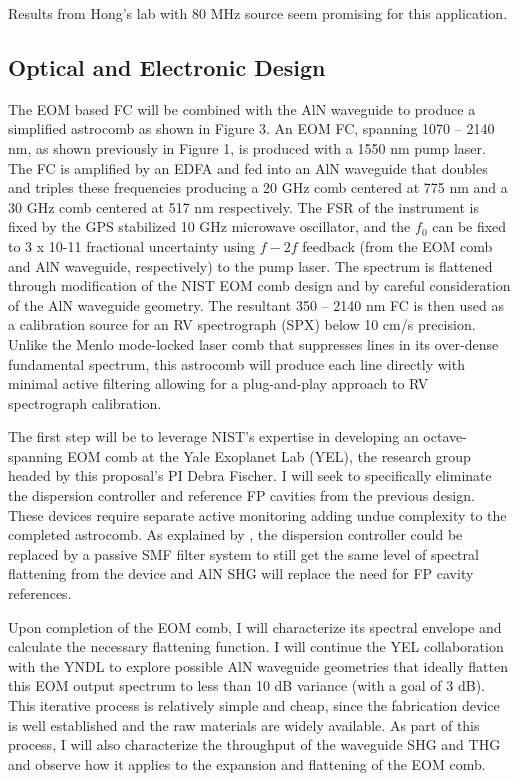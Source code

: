 \documentclass[11pt]{article}
\begin{document}
Results from Hong's lab with 80 MHz source seem promising for this application.

\subsection{Optical and Electronic Design}

The EOM based FC will be combined with the AlN waveguide to produce a simplified astrocomb as shown in Figure 3. An EOM FC, spanning 1070 – 2140 nm, as shown previously in Figure 1, is produced with a 1550 nm pump laser. The FC is amplified by an EDFA and fed into an AlN waveguide that doubles and triples these frequencies producing a 20 GHz comb centered at 775 nm and a 30 GHz comb centered at 517 nm respectively. The FSR of the instrument is fixed by the GPS stabilized 10 GHz microwave oscillator, and the $f_0$ can be fixed to 3 x 10-11 fractional uncertainty using $f-2f$ feedback (from the EOM comb and AlN waveguide, respectively) to the pump laser. The spectrum is flattened through modification of the NIST EOM comb design and by careful consideration of the AlN waveguide geometry. The resultant 350 – 2140 nm FC is then used as a calibration source for an RV spectrograph (SPX) below 10 cm/s precision. Unlike the Menlo mode-locked laser comb that suppresses lines in its over-dense fundamental spectrum, this astrocomb will produce each line directly with minimal active filtering allowing for a plug-and-play approach to RV spectrograph calibration.

The first step will be to leverage NIST’s expertise in developing an octave-spanning EOM comb at the Yale Exoplanet Lab (YEL), the research group headed by this proposal’s PI Debra Fischer. I will seek to specifically eliminate the dispersion controller and reference FP cavities from the previous design. These devices require separate active monitoring adding undue complexity to the completed astrocomb. As explained by \citep{Beha2017}, the dispersion controller could be replaced by a passive SMF filter system to still get the same level of spectral flattening from the device and AlN SHG will replace the need for FP cavity references.

Upon completion of the EOM comb, I will characterize its spectral envelope and calculate the necessary flattening function. I will continue the YEL collaboration with the YNDL to explore possible AlN waveguide geometries that ideally flatten this EOM output spectrum to less than 10 dB variance (with a goal of 3 dB). This iterative process is relatively simple and cheap, since the fabrication device is well established and the raw materials are widely available. As part of this process, I will also characterize the throughput of the waveguide SHG and THG and observe how it applies to the expansion and flattening of the EOM comb.
\end{document}
